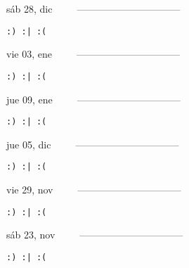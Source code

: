 \documentclass[letterpaper,10pt]{article}
\begin{document}
\begin{multicols}{3}
{sáb 28, dic\ \ \ \ \ --------------------------------}
\begin{flushright}\begin{small}\texttt{:) :| :(}\end{small}\end{flushright}
\vfill
{vie 03, ene\ \ \ \ \ --------------------------------}
\begin{flushright}\begin{small}\texttt{:) :| :(}\end{small}\end{flushright}\par
\vfill
{jue 09, ene\ \ \ \ \ --------------------------------}
\begin{flushright}\begin{small}\texttt{:) :| :(}\end{small}\end{flushright}\par
\vfill
\end{multicols}
\vspace{1.05cm}

\begin{multicols}{3}
{jue 05, dic\ \ \ \ \ --------------------------------}
\begin{flushright}\begin{small}\texttt{:) :| :(}\end{small}\end{flushright}
\vfill
{vie 29, nov\ \ \ \ \ --------------------------------}
\begin{flushright}\begin{small}\texttt{:) :| :(}\end{small}\end{flushright}\par
\vfill
{sáb 23, nov\ \ \ \ \ --------------------------------}
\begin{flushright}\begin{small}\texttt{:) :| :(}\end{small}\end{flushright}\par
\vfill
\end{multicols}
\vspace{1.05cm}
\end{document}
